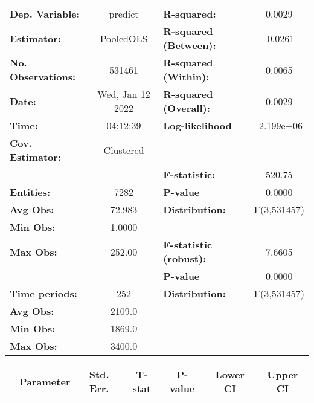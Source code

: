 \begin{center}
\begin{tabular}{lclc}
\toprule
\textbf{Dep. Variable:}    &      predict       & \textbf{  R-squared:         }   &      0.0029      \\
\textbf{Estimator:}        &     PooledOLS      & \textbf{  R-squared (Between):}  &     -0.0261      \\
\textbf{No. Observations:} &       531461       & \textbf{  R-squared (Within):}   &      0.0065      \\
\textbf{Date:}             &  Wed, Jan 12 2022  & \textbf{  R-squared (Overall):}  &      0.0029      \\
\textbf{Time:}             &      04:12:39      & \textbf{  Log-likelihood     }   &    -2.199e+06    \\
\textbf{Cov. Estimator:}   &     Clustered      & \textbf{                     }   &                  \\
\textbf{}                  &                    & \textbf{  F-statistic:       }   &      520.75      \\
\textbf{Entities:}         &        7282        & \textbf{  P-value            }   &      0.0000      \\
\textbf{Avg Obs:}          &       72.983       & \textbf{  Distribution:      }   &   F(3,531457)    \\
\textbf{Min Obs:}          &       1.0000       & \textbf{                     }   &                  \\
\textbf{Max Obs:}          &       252.00       & \textbf{  F-statistic (robust):} &      7.6605      \\
\textbf{}                  &                    & \textbf{  P-value            }   &      0.0000      \\
\textbf{Time periods:}     &        252         & \textbf{  Distribution:      }   &   F(3,531457)    \\
\textbf{Avg Obs:}          &       2109.0       & \textbf{                     }   &                  \\
\textbf{Min Obs:}          &       1869.0       & \textbf{                     }   &                  \\
\textbf{Max Obs:}          &       3400.0       & \textbf{                     }   &                  \\
\bottomrule
\end{tabular}
\begin{tabular}{lcccccc}
                & \textbf{Parameter} & \textbf{Std. Err.} & \textbf{T-stat} & \textbf{P-value} & \textbf{Lower CI} & \textbf{Upper CI}  \\

\end{tabular}
\end{center}

